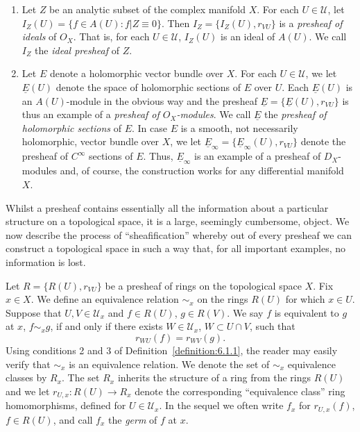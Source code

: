 \begin{enumerate}
\item Let $Z$ be an analytic subset of the complex manifold $X$. For each $U\in\mathcal U$, let $I_Z(U)=\{f\in A(U):f|Z\equiv0\}$. Then $I_Z=\{I_Z(U),r_{VU}\}$ is a
\emph{presheaf of ideals} of $O_X$. That is, for each $U\in\mathcal U$, $I_Z(U)$ is an ideal of $A(U)$. We call $I_Z$ the \emph{ideal presheaf} of $Z$.
\item Let $E$ denote a holomorphic vector bundle over $X$. For each $U\in\mathcal U$, we let $\underline E(U)$ denote the space of holomorphic sections of $E$ over $U$. Each $\underline E(U)$ is an $A(U)$-module in the obvious way and the presheaf $\underline E=\{\underline E(U),r_{VU}\}$ is thus an example of a \emph{presheaf of $O_X$-modules}. We call $\underline E$ the \emph{presheaf of holomorphic sections} of $E$. In case $E$ is a smooth, not necessarily holomorphic, vector bundle over $X$, we let $\underline E_\infty=\{\underline E_\infty(U),r_{VU}\}$ denote the presheaf of $C^\infty$ sections of $E$. Thus, $\underline E_\infty$ is an example of a presheaf of $D_X$-modules and, of course, the construction works for any differential manifold $X$.
\end{enumerate}
Whilst a presheaf contains essentially all the information about a particular structure on a topological space, it is a large, seemingly cumbersome, object. We now describe the process of ``sheafification'' whereby out of every presheaf we can construct a topological space in such a way that, for all important examples, no information is lost.

Let $R=\{R(U),r_{VU}\}$ be a presheaf of rings on the topological space $X$. Fix $x\in X$. We define an equivalence relation $\sim_x$ on the rings $R(U)$ for which $x\in U$. Suppose that $U,V\in\mathcal U_x$ and $f\in R(U)$, $g\in R(V)$. We say $f$ is equivalent to $g$ at $x$, $f\sim_x g$, if and only if there exists $W\in\mathcal U_x$, $W\subset U\cap V$, such that
\[
r_{WU}(f)=r_{WV}(g).
\]
Using conditions 2 and 3 of Definition~\ref{definition:6.1.1}, the reader may easily verify that $\sim_x$ is an equivalence relation. We denote the set of $\sim_x$ equivalence classes by $R_x$. The set $R_x$ inherits the structure of a ring from the rings $R(U)$ and we let $r_{U,x}:R(U)\to R_x$ denote the corresponding ``equivalence class'' ring homomorphisms, defined for $U\in\mathcal U_x$. In the sequel we often write $f_x$ for $r_{U,x}(f)$, $f\in R(U)$, and call $f_x$ the \emph{germ} of $f$ at $x$.

